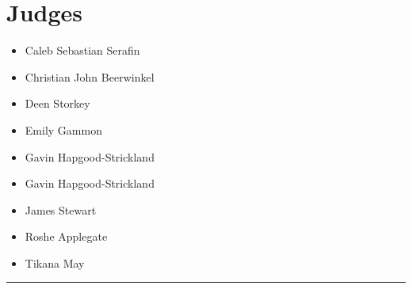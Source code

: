 \documentclass[10pt]{article}
\begin{document}
		\section*{\faUsers \: Judges}

		

	\begin{multicols}{2}

		\begin{itemize}
									\item Caleb Sebastian Serafin
									\item Christian John Beerwinkel
									\item Deen Storkey
									\item Emily Gammon
									\item Gavin Hapgood-Strickland
						\end{itemize}

		\vfill\null
		\columnbreak

		\begin{itemize}
									\item Gavin Hapgood-Strickland
									\item James Stewart
									\item Roshe Applegate
									\item Tikana May
						\end{itemize}

		\vfill\null

		\end{multicols}



			\vspace{0.5cm}
	\hrule
	\vspace{0.5cm}
\end{document}
